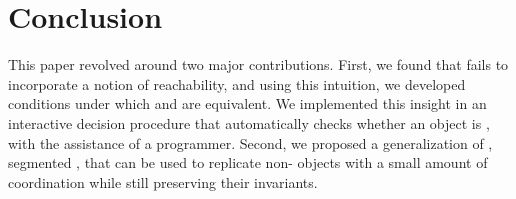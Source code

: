 \pagebreak
\section{Conclusion}
This paper revolved around two major contributions. First, we found that
\invariantclosure{} fails to incorporate a notion of reachability, and using
this intuition, we developed conditions under which \invariantclosure{} and
\invariantconfluence{} are equivalent. We implemented this insight in an
interactive \invariantconfluence{} decision procedure that automatically checks
whether an object is \invariantconfluent{}, with the assistance of a
programmer.
%
Second, we proposed a generalization of
\invariantconfluence{}, segmented \invariantconfluence{}, that can be used to
replicate non-\invariantconfluent{} objects with a small amount of coordination
while still preserving their invariants.
